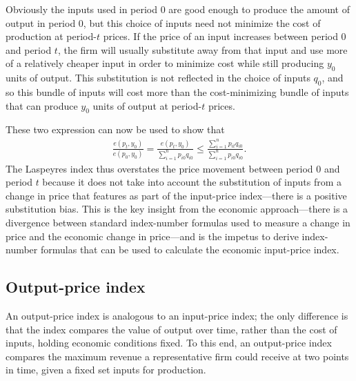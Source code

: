 \documentclass[
]{article}
\begin{document}
Obviously the inputs used in period 0 are good enough to produce the amount of output in period 0, but this choice of inputs need not minimize the cost of production at period-\(t\) prices. If the price of an input increases between period 0 and period \(t\), the firm will usually substitute away from that input and use more of a relatively cheaper input in order to minimize cost while still producing \(y_{0}\) units of output. This substitution is not reflected in the choice of inputs \(q_{0}\), and so this bundle of inputs will cost more than the cost-minimizing bundle of inputs that can produce \(y_{0}\) units of output at period-\(t\) prices.

These two expression can now be used to show that
\begin{align*}
\frac{e(p_{t}, y_{0})}{e(p_{0}, y_{0})} = \frac{e(p_{t}, y_{0})}{\sum_{i = 1}^{n} p_{i0} q_{i0}} \leq \frac{\sum_{i = 1}^{n} p_{it} q_{i0}}{\sum_{i = 1}^{n} p_{i0} q_{i0}}.
\end{align*}
The Laspeyres index thus overstates the price movement between period 0 and period \(t\) because it does not take into account the substitution of inputs from a change in price that features as part of the input-price index---there is a positive substitution bias. This is the key insight from the economic approach---there is a divergence between standard index-number formulas used to measure a change in price and the economic change in price---and is the impetus to derive index-number formulas that can be used to calculate the economic input-price index.

\hypertarget{output-price-index}{%
\subsection{Output-price index}\label{output-price-index}}

An output-price index is analogous to an input-price index; the only difference is that the index compares the value of output over time, rather than the cost of inputs, holding economic conditions fixed. To this end, an output-price index compares the maximum revenue a representative firm could receive at two points in time, given a fixed set inputs for production.
\end{document}

